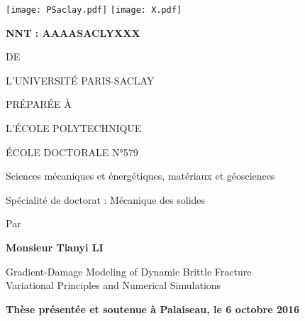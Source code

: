 
\begin{titlepage}

\begin{flushleft}
\texttt{[image: PSaclay.pdf]} \hfill
\texttt{[image: X.pdf]}
\end{flushleft}
\vspace{10pt}

\begin{mdframed}
\begin{flushleft}
\large\textbf{NNT : AAAASACLYXXX}
\end{flushleft}
\vspace{20pt}

\begin{center}
{\color{color02}{\LARGE THÈSE DE DOCTORAT}

\vspace{8pt}
{\LARGE DE}

\vspace{8pt}
{\LARGE L'UNIVERSITÉ PARIS-SACLAY}

\vspace{8pt}
{\LARGE PRÉPARÉE À}

\vspace{8pt}
{\LARGE L'ÉCOLE POLYTECHNIQUE}}

\vspace{24pt}
{\Large ÉCOLE DOCTORALE N°579}

\vspace{5pt}
{\Large Sciences mécaniques et énergétiques, matériaux et géosciences}

\vspace{16pt}
{\Large Spécialité de doctorat : Mécanique des solides}
\vspace{12pt}

{\large Par}
\vspace{12pt}

{\LARGE\bfseries Monsieur Tianyi LI}
\vspace{20pt}

{\LARGE \sffamily
Gradient-Damage Modeling of Dynamic Brittle Fracture \\ \vspace{0.2cm}
Variational Principles and Numerical Simulations}
\end{center}

\vfill
\begin{flushleft}
\large
\textbf{Thèse présentée et soutenue à Palaiseau, le 6 octobre 2016}
\vspace{15pt}


\end{flushleft}
\end{mdframed}
\end{titlepage}
